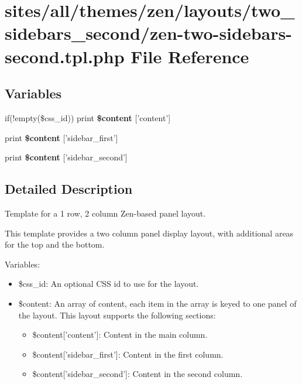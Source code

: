 \hypertarget{zen-two-sidebars-second_8tpl_8php}{
\section{sites/all/themes/zen/layouts/two\_\-sidebars\_\-second/zen-two-sidebars-second.tpl.php File Reference}
\label{zen-two-sidebars-second_8tpl_8php}
}
\subsection*{Variables}
\begin{CompactItemize}
\item 
\hypertarget{zen-two-sidebars-second_8tpl_8php_16767ac2e2b027ec00a0c12535d2ba7a}{
if(!empty(\$css\_\-id)) print \textbf{\$content} \mbox{[}'content'\mbox{]}}
\label{zen-two-sidebars-second_8tpl_8php_16767ac2e2b027ec00a0c12535d2ba7a}

\item 
\hypertarget{zen-two-sidebars-second_8tpl_8php_8fbe76276dfb5a084cc042c32e8e6394}{
print \textbf{\$content} \mbox{[}'sidebar\_\-first'\mbox{]}}
\label{zen-two-sidebars-second_8tpl_8php_8fbe76276dfb5a084cc042c32e8e6394}

\item 
\hypertarget{zen-two-sidebars-second_8tpl_8php_4f8fb8ae436a00e7bdfe8b16bc3f0dd4}{
print \textbf{\$content} \mbox{[}'sidebar\_\-second'\mbox{]}}
\label{zen-two-sidebars-second_8tpl_8php_4f8fb8ae436a00e7bdfe8b16bc3f0dd4}

\end{CompactItemize}


\subsection{Detailed Description}
Template for a 1 row, 2 column Zen-based panel layout.

This template provides a two column panel display layout, with additional areas for the top and the bottom.

Variables:\begin{itemize}
\item \$css\_\-id: An optional CSS id to use for the layout.\item \$content: An array of content, each item in the array is keyed to one panel of the layout. This layout supports the following sections:\begin{itemize}
\item \$content\mbox{[}'content'\mbox{]}: Content in the main column.\item \$content\mbox{[}'sidebar\_\-first'\mbox{]}: Content in the first column.\item \$content\mbox{[}'sidebar\_\-second'\mbox{]}: Content in the second column. \end{itemize}
\end{itemize}
